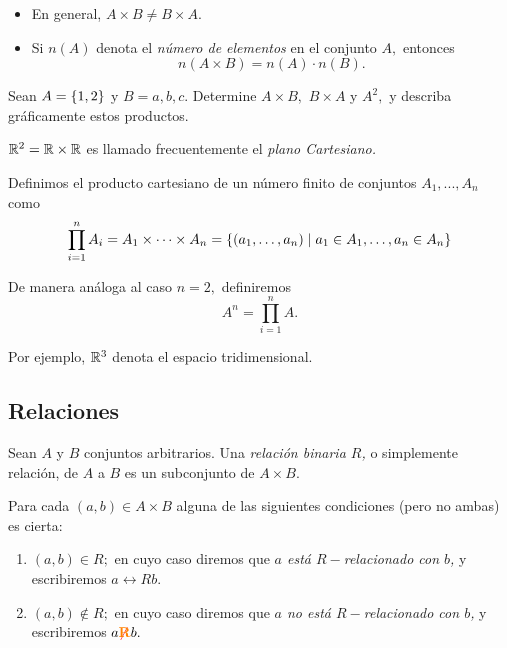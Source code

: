 	\begin{rem}
		\begin{itemize}
			\item En general, $A\times B \neq B \times A.$
			\item Si \emph{$n(A)$} denota el \emph{número de elementos} en el conjunto $A,$ entonces
			$$
			n(A \times B)= n(A) \cdot n(B).
			$$
		\end{itemize}
		
	\end{rem}
	




	Sean $A=\left\{ 1,2 \right\}$ y $B={a,b,c}.$ Determine $A\times B,$ $B\times A$ y $A^{2},$ y describa gráficamente estos productos.



	\begin{problema}
		$\mathbb{R}^{2}=\mathbb{R} \times \mathbb{R}$ es llamado frecuentemente el \emph{plano Cartesiano.}
	\end{problema}
	



	\begin{defn}
		Definimos el producto cartesiano de un número finito de conjuntos $A_{1},...,A_{n}$ como
		$$
		\prod_{i=1}^{n} A_{i}= A_{1} \times \cdots \times A_{n}=\left\{ \left( a_{1},\dots,a_{n} \right)\mid a_{1}\in A_{1}, \dots, a_{n}\in A_{n} \right\}
		$$
	\end{defn}
	



	\begin{rem}
		De manera análoga al caso $n=2,$ definiremos
		$$
		A^{n}=\prod_{i=1}^{n}A.
		$$
		
		
		Por ejemplo, $\mathbb{R}^{3}$ denota el espacio tridimensional.
	\end{rem}
	


\subsection{Relaciones}


	\begin{defn}
		Sean $A$ y $B$ conjuntos arbitrarios. Una \emph{relación binaria $R$,} o simplemente relación, de $A$ a $B$ es un subconjunto de $A \times B.$
	\end{defn}
	



	Para cada $(a,b)\in A \times B$ alguna de las siguientes condiciones (pero no ambas) es cierta:
	\begin{enumerate}
		\item $(a,b)\in R;$ en cuyo caso diremos que \emph{$a$ está $R-$relacionado con $b$,} y escribiremos $a \rel{R} b.$
		\item $(a,b)\not\in R;$ en cuyo caso diremos que \emph{$a$ no está $R-$relacionado con $b$,} y escribiremos $a { {\color{red}\not}{\color{orange}\textbf{R}} } b.$
	\end{enumerate}
	



